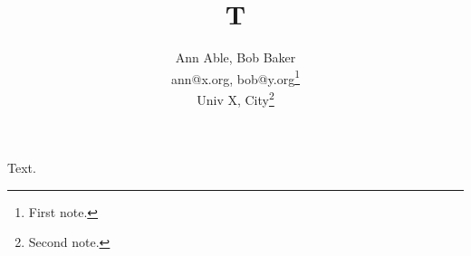 \documentclass{article}
\begin{document}
\title{T}
\author{Ann Able, Bob Baker\\ ann@x.org, bob@y.org\thanks{First note.}\\ Univ X, City\thanks{Second note.}}
\maketitle
Text.
\end{document}
